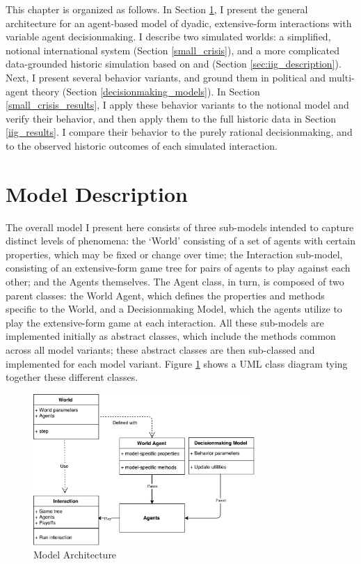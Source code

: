 This chapter is organized as follows. In Section \ref{description}, I present the general architecture for an agent-based model of dyadic, extensive-form interactions with variable agent decisionmaking. I describe two simulated worlds: a simplified, notional international system (Section \ref{small_crisis}), and a more complicated data-grounded historic simulation based on \citet{bdm_1992} and \citet{bennett_2000} (Section \ref{sec:iig_description}). Next, I present several behavior variants, and ground them in political and multi-agent theory (Section \ref{decisionmaking_models}). In Section \ref{small_crisis_results}, I apply these behavior variants to the notional model and verify their behavior, and then apply them to the full historic data in Section \ref{iig_results}. I compare their behavior to the purely rational decisionmaking, and to the observed historic outcomes of each simulated interaction.

\section{Model Description} \label{description}

The overall model I present here consists of three sub-models intended to capture distinct levels of phenomena: the `World' consisting of a set of agents with certain properties, which may be fixed or change over time; the Interaction sub-model, consisting of an extensive-form game tree for pairs of agents to play against each other; and the Agents themselves. The Agent class, in turn, is composed of two parent classes: the World Agent, which defines the properties and methods specific to the World, and a Decisionmaking Model, which the agents utilize to play the extensive-form game at each interaction. All these sub-models are implemented initially as abstract classes, which include the methods common across all model variants; these abstract classes are then sub-classed and implemented for each model variant. Figure \ref{fig:model_architecture} shows a UML class diagram tying together these different classes.

\begin{figure}[h!]
    \centering
	\includegraphics[width=0.75\textwidth]{WarReason/Figures/ModelArchitecture}
    \caption{Model Architecture}
    \label{fig:model_architecture}
    \figSpace
\end{figure}

